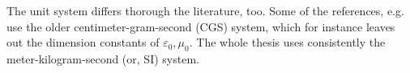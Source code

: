 The unit system differs thorough the literature, too. Some of the references, e.g. \cite{landau1984electrodynamics, agranovich2006spatial, krowne2007book_agran} use the older centimeter-gram-second (CGS) system, which for instance leaves out the dimension constants of $\varepsilon_0, \mu_0$. The whole thesis uses consistently the meter-kilogram-second (or, SI) system.
